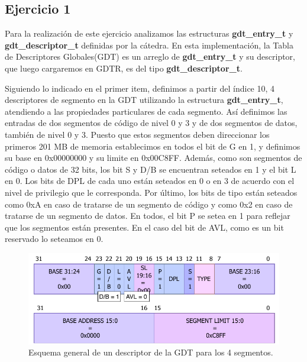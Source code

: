 \documentclass[a4paper]{article}
\begin{document}
\subsection{Ejercicio 1}
\justify
Para la realización de este ejercicio analizamos las estructuras \textbf{gdt_entry_t} y \textbf{gdt_descriptor_t} definidas por la cátedra. En esta implementación, la Tabla de Descriptores Globales(GDT) es un arreglo de  \textbf{gdt_entry_t} y su descriptor, que luego cargaremos en GDTR, es del tipo \textbf{gdt_descriptor_t}.\par
\justify
Siguiendo lo indicado en el primer item, definimos a partir del índice 10, 4 descriptores de segmento en la GDT utilizando la estructura \textbf{gdt_entry_t}, atendiendo a las propiedades particulares de cada segmento. Así definimos las entradas de dos segmentos de código de nivel
0 y 3 y de dos segmentos de datos, también de nivel 0 y 3. Puesto que estos segmentos deben direccionar los primeros 201 MB de memoria establecimos en todos el bit de G en 1, y definimos su base en 0x00000000 y su limite en 0x00C8FF. Además, como son segmentos de código o datos de 32 bits, los bit S y D/B se encuentran seteados en 1 y el bit L en 0. Los bits de DPL de cada uno están seteados en 0 o en 3 de acuerdo con el nivel de privilegio que le corresponda. Por último, los bits de tipo están seteados como 0xA en caso de tratarse de un segmento de código y como 0x2 en caso de tratarse de un segmento de datos. En todos, el bit P se setea en 1 para reflejar que los segmentos están presentes. En el caso del bit de AVL, como es un bit reservado lo seteamos en 0.

\begin{figure}[h]
	\centering
	\includegraphics[scale=0.8]{img/GDTdescriptor.pdf}
	\caption{Esquema general de un descriptor de la GDT para los 4 segmentos.}
\end{figure}
\end{document}
